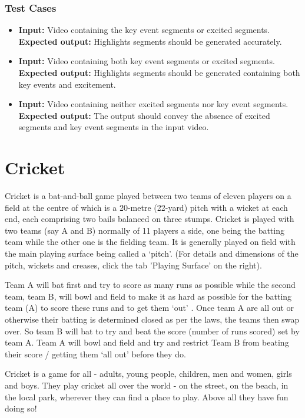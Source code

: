 \subsection{Test Cases}
\begin{itemize}
\item \textbf{Input:} Video containing the key event segments or excited segments.\\
\indent\textbf{Expected output:} Highlights segments should be generated accurately.
\item \textbf{Input:} Video containing both key event segments or excited segments.\\
\indent\textbf{Expected output:} Highlights segments should be generated containing both key events and excitement.
\item \textbf{Input:} Video containing neither excited segments nor key event segments.\\
\indent\textbf{Expected output:} The output should convey the absence of excited segments and key event segments in the input video.
\end{itemize}

\chapter{Cricket}
Cricket is a bat-and-ball game played between two teams of eleven players on a field at the centre of which is a 20-metre (22-yard) pitch with a wicket at each end, each comprising two bails balanced on three stumps. Cricket is played with two teams (say A and B) normally of 11 players a side, one being the batting team while the other one is the fielding team. It is generally played on field with the main playing surface being called a ‘pitch’. (For details and dimensions of the pitch, wickets and creases, click the tab 'Playing Surface' on the right).

Team A will bat first and try to score as many runs as possible while the second team, team B, will bowl and field to make it as hard as possible for the batting team (A) to score these runs and to get them ‘out’ . Once team A are all out or otherwise their batting is determined closed as per the laws, the teams then swap over. So team B will bat to try and beat the score (number of runs scored) set by team A. Team A will bowl and field and try and restrict Team B from beating their score / getting them ‘all out’ before they do.

Cricket is a game for all - adults, young people, children, men and women, girls and boys. They play cricket all over the world - on the street, on the beach, in the local park, wherever they can find a place to play. Above all they have fun doing so!

